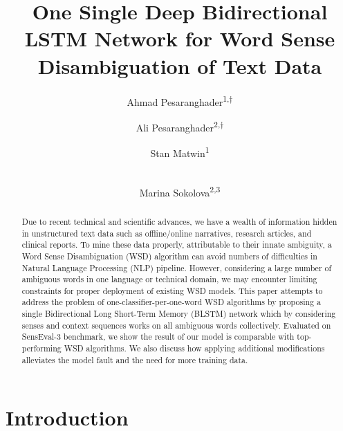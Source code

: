 \documentclass{llncs}
\begin{document}
	
	\title{One Single Deep Bidirectional LSTM Network for Word Sense Disambiguation of Text Data}
\author{Ahmad Pesaranghader\textsuperscript{1,$\dagger$} \and
		Ali Pesaranghader\textsuperscript{2,$\dagger$} \and
		Stan Matwin\textsuperscript{1} \and\\
		Marina Sokolova\textsuperscript{2,3}
	}
	
	
	\maketitle              
\begin{abstract}
Due to recent technical and scientific advances, we have a wealth of information hidden in unstructured text data such as offline/online narratives, research articles, and clinical reports. To mine these data properly, attributable to their innate ambiguity, a Word Sense Disambiguation (WSD) algorithm can avoid numbers of difficulties in Natural Language Processing (NLP) pipeline. However, considering a large number of ambiguous words in one language or technical domain, we may encounter limiting constraints for proper deployment of existing WSD models. This paper attempts to address the problem of one-classifier-per-one-word WSD algorithms by proposing a single Bidirectional Long Short-Term Memory (BLSTM) network which by considering senses and context sequences works on all ambiguous words collectively. Evaluated on SensEval-3 benchmark, we show the result of our model is comparable with top-performing WSD algorithms. We also discuss how applying additional modifications alleviates the model fault and the need for more training data.

\end{abstract}
\section{Introduction}
\end{document}
